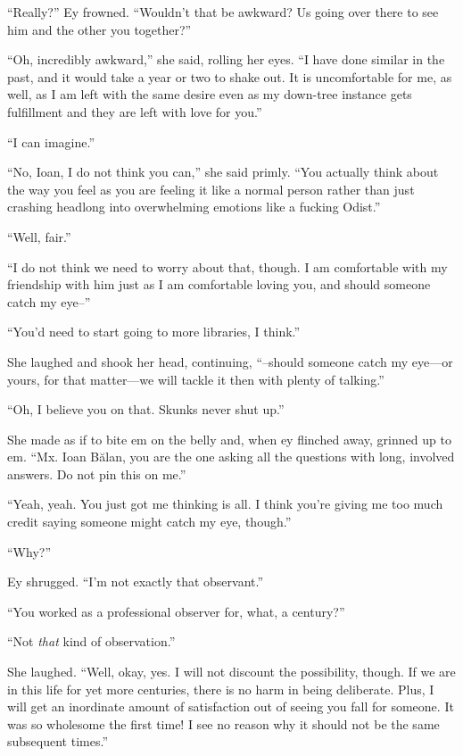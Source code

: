 ``Really?'' Ey frowned. ``Wouldn't that be awkward? Us going over there to see him and the other you together?''

``Oh, incredibly awkward,'' she said, rolling her eyes. ``I have done similar in the past, and it would take a year or two to shake out. It is uncomfortable for me, as well, as I am left with the same desire even as my down-tree instance gets fulfillment and they are left with love for you.''

``I can imagine.''

``No, Ioan, I do not think you can,'' she said primly. ``You actually think about the way you feel as you are feeling it like a normal person rather than just crashing headlong into overwhelming emotions like a fucking Odist.''

``Well, fair.''

``I do not think we need to worry about that, though. I am comfortable with my friendship with him just as I am comfortable loving you, and should someone catch my eye--''

``You'd need to start going to more libraries, I think.''

She laughed and shook her head, continuing, ``--should someone catch my eye—or yours, for that matter—we will tackle it then with plenty of talking.''

``Oh, I believe you on that. Skunks never shut up.''

She made as if to bite em on the belly and, when ey flinched away, grinned up to em. ``Mx. Ioan Bălan, you are the one asking all the questions with long, involved answers. Do not pin this on me.''

``Yeah, yeah. You just got me thinking is all. I think you're giving me too much credit saying someone might catch my eye, though.''

``Why?''

Ey shrugged. ``I'm not exactly that observant.''

``You worked as a professional observer for, what, a century?''

``Not \emph{that} kind of observation.''

She laughed. ``Well, okay, yes. I will not discount the possibility, though. If we are in this life for yet more centuries, there is no harm in being deliberate. Plus, I will get an inordinate amount of satisfaction out of seeing you fall for someone. It was so wholesome the first time! I see no reason why it should not be the same subsequent times.''

